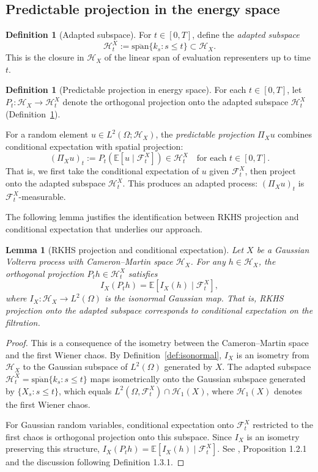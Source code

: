 \documentclass[11pt,a4paper]{article}
\theoremstyle{plain}
\newtheorem{lemma}[theorem]{Lemma}
\theoremstyle{definition}
\newtheorem{definition}[theorem]{Definition}
\theoremstyle{remark}
\newcommand{\E}{\mathbb{E}}
\newcommand{\Lp}[1]{L^{#1}}
\newcommand{\Ft}{\mathcal{F}_t}
\newcommand{\HX}{\mathcal{H}_X}
\newcommand{\HtX}{\mathcal{H}_t^X}
\begin{document}
\subsection{Predictable projection in the energy space}

\begin{definition}[Adapted subspace]\label{def:adapted-subspace}
For $t \in [0,T]$, define the \emph{adapted subspace}
\[
\HtX := \overline{\mathrm{span}}\{k_s : s \leq t\} \subset \HX.
\]
This is the closure in $\HX$ of the linear span of evaluation representers up to time $t$.
\end{definition}

\begin{definition}[Predictable projection in energy space]\label{def:energy-pred-proj}
For each $t \in [0,T]$, let $P_t: \HX \to \HtX$ denote the orthogonal projection onto the adapted subspace $\HtX$ (Definition~\ref{def:adapted-subspace}).

For a random element $u \in \Lp{2}(\Omega; \HX)$, the \emph{predictable projection} $\Pi_X u$ combines conditional expectation with spatial projection:
\[
(\Pi_X u)_t := P_t\left(\E[u \mid \Ft^X]\right) \in \HtX \quad \text{for each } t \in [0,T].
\]
That is, we first take the conditional expectation of $u$ given $\Ft^X$, then project onto the adapted subspace $\HtX$. This produces an adapted process: $(\Pi_X u)_t$ is $\Ft^X$-measurable.
\end{definition}

The following lemma justifies the identification between RKHS projection and conditional expectation that underlies our approach.

\begin{lemma}[RKHS projection and conditional expectation]\label{lem:rkhs-cond-exp}
Let $X$ be a Gaussian Volterra process with Cameron--Martin space $\HX$. For any $h \in \HX$, the orthogonal projection $P_t h \in \HtX$ satisfies
\[
I_X(P_t h) = \E[I_X(h) \mid \Ft^X],
\]
where $I_X: \HX \to \Lp{2}(\Omega)$ is the isonormal Gaussian map. That is, RKHS projection onto the adapted subspace corresponds to conditional expectation on the filtration.
\end{lemma}

\begin{proof}
This is a consequence of the isometry between the Cameron--Martin space and the first Wiener chaos. By Definition~\ref{def:isonormal}, $I_X$ is an isometry from $\HX$ to the Gaussian subspace of $\Lp{2}(\Omega)$ generated by $X$. The adapted subspace $\HtX = \overline{\mathrm{span}}\{k_s : s \leq t\}$ maps isometrically onto the Gaussian subspace generated by $\{X_s : s \leq t\}$, which equals $\Lp{2}(\Omega, \Ft^X) \cap \mathcal{H}_1(X)$, where $\mathcal{H}_1(X)$ denotes the first Wiener chaos.

For Gaussian random variables, conditional expectation onto $\Ft^X$ restricted to the first chaos is orthogonal projection onto this subspace. Since $I_X$ is an isometry preserving this structure, $I_X(P_t h) = \E[I_X(h) \mid \Ft^X]$. See \cite{Nualart06}, Proposition 1.2.1 and the discussion following Definition 1.3.1.
\end{proof}
\end{document}
